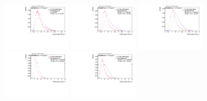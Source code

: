 \begin{figure}
\bigskip
\includegraphics[width=0.3\textwidth]{sascha_input/Appendix/Distributions/higgs/distributions/beta1/h_recoJet_D2_bin1.pdf} \hspace{1mm}
\includegraphics[width=0.3\textwidth]{sascha_input/Appendix/Distributions/higgs/distributions/beta1/h_recoJet_D2_bin2.pdf} \hspace{4mm}
\includegraphics[width=0.3\textwidth]{sascha_input/Appendix/Distributions/higgs/distributions/beta1/h_recoJet_D2_bin3.pdf} 
\bigskip
\includegraphics[width=0.3\textwidth]{sascha_input/Appendix/Distributions/higgs/distributions/beta1/h_recoJet_D2_bin4.pdf} \hspace{4mm}
\includegraphics[width=0.3\textwidth]{sascha_input/Appendix/Distributions/higgs/distributions/beta1/h_recoJet_D2_bin5.pdf} 


\end{figure}
